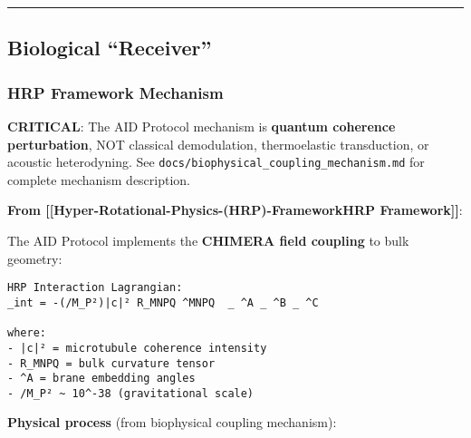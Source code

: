 \begin{center}\rule{0.5\linewidth}{0.5pt}\end{center}

\subsection{Biological ``Receiver''}\label{biological-receiver}

\subsubsection{HRP Framework Mechanism}\label{hrp-framework-mechanism}

\textbf{ CRITICAL}: The AID Protocol mechanism is \textbf{quantum
coherence perturbation}, NOT classical demodulation, thermoelastic
transduction, or acoustic heterodyning. See
\texttt{docs/biophysical\_coupling\_mechanism.md} for complete mechanism
description.

\textbf{From {[}{[}Hyper-Rotational-Physics-(HRP)-Framework\textbar HRP
Framework{]}{]}}:

The AID Protocol implements the \textbf{CHIMERA field coupling} to bulk
geometry:

\begin{verbatim}
HRP Interaction Lagrangian:
_int = -(/M_P²)|c|² R_MNPQ ^MNPQ  _ ^A _ ^B _ ^C

where:
- |c|² = microtubule coherence intensity
- R_MNPQ = bulk curvature tensor
- ^A = brane embedding angles
- /M_P² ~ 10^-38 (gravitational scale)
\end{verbatim}

\textbf{Physical process} (from biophysical coupling mechanism):

